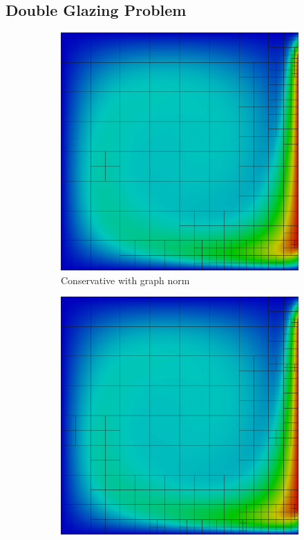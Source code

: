 \documentclass[letterpaper]{article}
\begin{document}
\subsection{Double Glazing Problem}

\begin{figure}
\centering
\begin{subfigure}[t]{0.45\textwidth}
\centering
\includegraphics[width=\textwidth]{figs/DoubleGlazing/graph6c.png}
\caption{Conservative with graph norm}
\label{fig:doubleglazingGraph6c}
\end{subfigure}
\begin{subfigure}[t]{0.45\textwidth}
\centering
\includegraphics[width=\textwidth]{figs/DoubleGlazing/robust6c.png}

\end{subfigure}
\end{figure}
\end{document}
